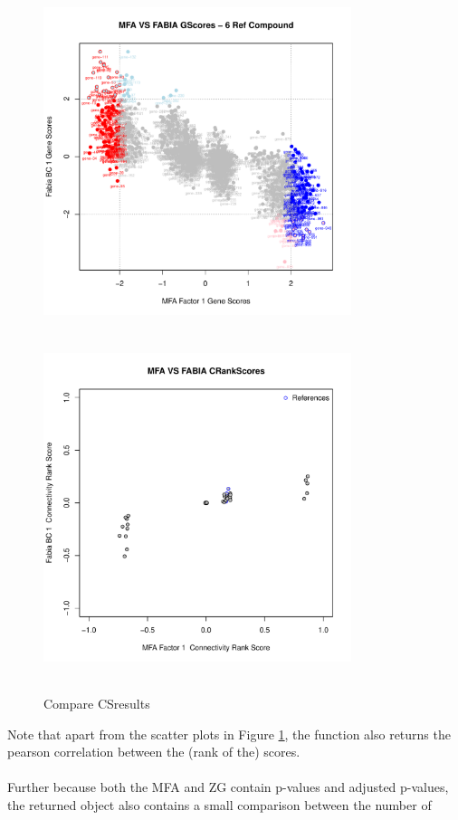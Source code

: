 \documentclass[a4paper]{article}\usepackage[]{graphicx}\usepackage[]{color}
\newenvironment{knitrout}{}{} %
\begin{document}
\begin{knitrout}
\begin{figure}[H]
\includegraphics[width=9cm,height=10cm]{figure/CScompare-4} 
\includegraphics[width=9cm,height=10cm]{figure/CScompare-5} \hfill{}

\caption[Compare CSresults]{Compare CSresults\label{fig:CScompare}}
\end{figure}


\end{knitrout}
\noindent Note that apart from the scatter plots in Figure \ref{fig:CScompare},
the function also returns the pearson correlation between the (rank of
the) scores.
\\ \\
Further because both the MFA and ZG contain p-values and adjusted p-values, the
returned object also contains a small comparison between the number of
\end{document}
